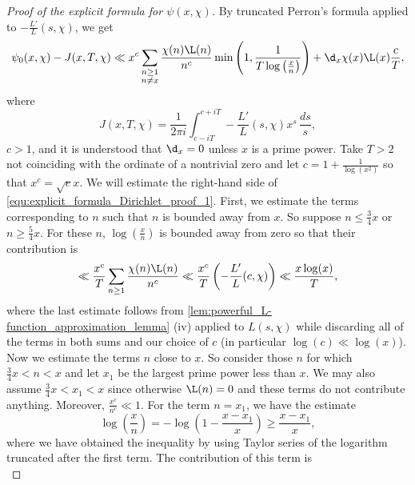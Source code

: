     \begin{proof}[Proof of the explicit formula for \(\psi(x,\chi)\)]
      By truncated Perron's formula applied to \(-\frac{L'}{L}(s,\chi)\), we get
      \begin{equation}\label{equ:explicit_formula_Dirichlet_proof_1}
        \psi_{0}(x,\chi)-J(x,T,\chi) \ll x^{c}\sum_{\substack{n \ge 1 \\ n \neq x}}\frac{\chi(n)\L(n)}{n^{c}}\min\left(1,\frac{1}{T\log\left(\frac{x}{n}\right)}\right)+\d_{x}\chi(x)\L(x)\frac{c}{T},
      \end{equation}
      where
      \[
        J(x,T,\chi) = \frac{1}{2\pi i}\int_{c-iT}^{c+iT}-\frac{L'}{L}(s,\chi)x^{s}\,\frac{ds}{s},
      \]
      \(c > 1\), and it is understood that \(\d_{x} = 0\) unless \(x\) is a prime power. Take \(T > 2\) not coinciding with the ordinate of a nontrivial zero and let \(c = 1+\frac{1}{\log(x^{2})}\) so that \(x^{c} = \sqrt{e}x\). We will estimate the right-hand side of \cref{equ:explicit_formula_Dirichlet_proof_1}. First, we estimate the terms corresponding to \(n\) such that \(n\) is bounded away from \(x\). So suppose \(n \le \frac{3}{4}x\) or \(n \ge \frac{5}{4}x\). For these \(n\), \(\log\left(\frac{x}{n}\right)\) is bounded away from zero so that their contribution is
      \begin{equation}\label{equ:explicit_formula_Dirichlet_proof_2}
        \ll \frac{x^{c}}{T}\sum_{n \ge 1}\frac{\chi(n)\L(n)}{n^{c}} \ll \frac{x^{c}}{T}\left(-\frac{L'}{L}(c,\chi)\right) \ll \frac{x\log(x)}{T},
      \end{equation}
      where the last estimate follows from \cref{lem:powerful_L-function_approximation_lemma} (iv) applied to \(L(s,\chi)\) while discarding all of the terms in both sums and our choice of \(c\) (in particular \(\log(c) \ll \log(x)\)). Now we estimate the terms \(n\) close to \(x\). So consider those \(n\) for which \(\frac{3}{4}x < n < x\) and let \(x_{1}\) be the largest prime power less than \(x\). We may also assume \(\frac{3}{4}x < x_{1} < x\) since otherwise \(\L(n) = 0\) and these terms do not contribute anything. Moreover, \(\frac{x^{c}}{n^{c}} \ll 1\). For the term \(n = x_{1}\), we have the estimate
      \[
        \log\left(\frac{x}{n}\right) = -\log\left(1-\frac{x-x_{1}}{x}\right) \ge \frac{x-x_{1}}{x},
      \]
      where we have obtained the inequality by using Taylor series of the logarithm truncated after the first term. The contribution of this term is
      \begin{equation}\label{equ:explicit_formula_Dirichlet_proof_3}

\end{equation}
\end{proof}
